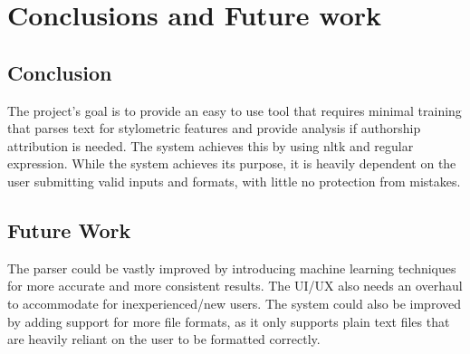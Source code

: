 \chapter{Conclusions and Future work}

\section{Conclusion}
The project's goal is to provide an easy to use tool that requires minimal training that parses text for stylometric features and provide analysis if authorship attribution is needed. The system achieves this by using nltk and regular expression. While the system achieves its purpose, it is heavily dependent on the user submitting valid inputs and formats, with little no protection from mistakes.

\section{Future Work}
The parser could be vastly improved by introducing machine learning techniques for more accurate and more consistent results. The UI/UX also needs an overhaul to accommodate for inexperienced/new users. The system could also be improved by adding support for more file formats, as it only supports plain text files that are heavily reliant on the user to be formatted correctly.
